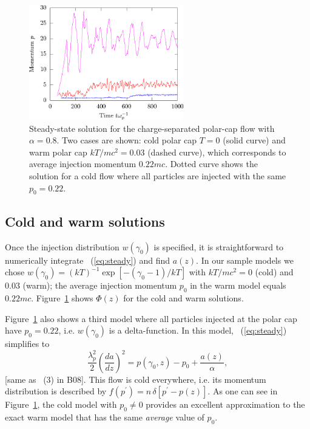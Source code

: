 \begin{figure}[h]
\begin{center}
  \includegraphics[width=0.6\textwidth]{pics/chap2/f1.eps}
\caption{Steady-state solution for the charge-separated polar-cap flow with
$\alpha=0.8$. Two cases are shown: cold polar cap $T=0$ (solid curve)
and warm polar cap $kT/mc^2=0.03$ (dashed curve), which corresponds
to average injection momentum $0.22mc$.
Dotted curve shows the solution for a cold flow where all particles are injected with the same $p_0=0.22$.
}
\label{fig:steady}
\end{center}
\end{figure}


\subsection{Cold and warm solutions}\label{sec:solutions}

Once the injection distribution $w(\gamma_0)$ is specified,
it is straightforward to numerically integrate \Eq~(\ref{eq:steady}) and find $a(z)$.
In our sample models we chose
$w(\gamma_0)=(kT)^{-1}\exp[-(\gamma_0-1)/kT]$ with $kT/mc^2=0$ (cold) and
0.03 (warm); the average injection momentum $p_0$ in the warm model equals
$0.22mc$. Figure~\ref{fig:steady} shows $\Phi(z)$ for the cold and warm solutions.

Figure~\ref{fig:steady} also shows a third model where all particles injected at the polar cap
have $p_0=0.22$, i.e. $w(\gamma_0)$ is a delta-function.
In this model, \Eq~(\ref{eq:steady}) simplifies to
\begin{equation}
\label{eq:cold}
    \frac{\lambda_p^2}{2}\left(\frac{da}{dz}\right)^2 = p(\gamma_0,z)-p_0
                                                                               + \frac{a(z)}{\alpha},
\end{equation}
[same as \Eq~(3) in B08]. This flow is cold everywhere, i.e. its momentum
distribution is described by $f(p^\prime)=n\,\delta[p^\prime-p(z)]$.
As one can see in Figure~\ref{fig:steady}, the cold model with $p_0\neq 0$ provides an
excellent approximation to the exact warm model that has the same {\it average}
value of $p_0$.

